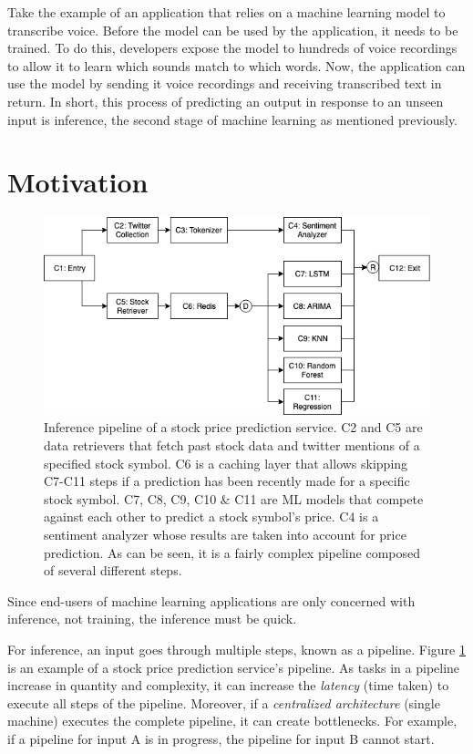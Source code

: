 \documentclass{report}
\begin{document}
Take the example of an application that relies on a machine learning model to transcribe voice.
Before the model can be used by the application, it needs to be trained.
To do this, developers expose the model to hundreds of voice recordings to allow it to learn which sounds match to which words.
Now, the application can use the model by sending it voice recordings and receiving transcribed text in return.
In short, this process of predicting an output in response to an unseen input is inference, the second stage of machine learning as mentioned previously.

\section{Motivation}\label{motivation}

\begin{figure}
  \centering
  \includegraphics[width=\textwidth]{StockPriceServiceBasic.png}
  \caption{Inference pipeline of a stock price prediction service. C2 and C5 are data retrievers that fetch past stock data and twitter mentions of a specified stock symbol. C6 is a caching layer that allows skipping C7-C11 steps if a prediction has been recently made for a specific stock symbol. C7, C8, C9, C10 \& C11 are ML models that compete against each other to predict a stock symbol's price. C4 is a sentiment analyzer whose results are taken into account for price prediction. As can be seen, it is a fairly complex pipeline composed of several different steps.}
  \label{fig:StockPriceServiceBasic}
\end{figure}

Since end-users of machine learning applications are only concerned with inference, not training, the inference must be quick.

For inference, an input goes through multiple steps, known as a pipeline.
Figure \ref{fig:StockPriceServiceBasic} is an example of a stock price prediction service's pipeline.
As tasks in a pipeline increase in quantity and complexity, it can increase the \textit{latency} (time taken) to execute all steps of the pipeline.
Moreover, if a \textit{centralized architecture} (single machine) executes the complete pipeline, it can create bottlenecks.
For example, if a pipeline for input A is in progress, the pipeline for input B cannot start.
\end{document}
